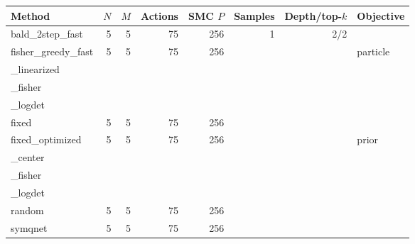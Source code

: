 \begin{tabular}{lrrrrrrl}
\toprule
Method & $N$ & $M$ & Actions & SMC $P$ & Samples & Depth/top-$k$ & Objective \\
\midrule
bald\_2step\_fast & 5 & 5 & 75 & 256 & 1 & 2/2 &  \\
fisher\_greedy\_fast & 5 & 5 & 75 & 256 &  &  & particle\\_linearized\\_fisher\\_logdet \\
fixed & 5 & 5 & 75 & 256 &  &  &  \\
fixed\_optimized & 5 & 5 & 75 & 256 &  &  & prior\\_center\\_fisher\\_logdet \\
random & 5 & 5 & 75 & 256 &  &  &  \\
symqnet & 5 & 5 & 75 & 256 &  &  &  \\
\bottomrule
\end{tabular}
